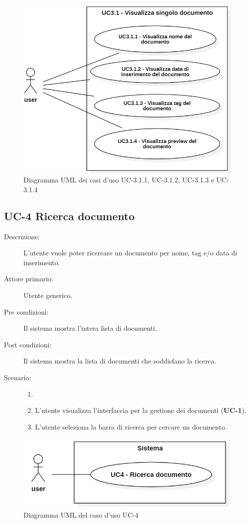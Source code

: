 \begin{figure}[H]
    \centering
    \includegraphics[width=0.8\linewidth]{UC3.1.1-2-3-4.PNG}
    \caption{Diagramma UML dei casi d'uso UC-3.1.1, UC-3.1.2, UC-3.1.3 e UC-3.1.4}
    \label{fig:UC3.1.1-2-3-4}
\end{figure}

\subsection{UC-4 Ricerca documento}
\begin{description}
    \item[Descrizione:] L’utente vuole poter ricercare un documento per nome, tag e/o data di inserimento.
    \item[Attore primario:] Utente generico.
    \item[Pre condizioni:] Il sistema mostra l’intera lista di documenti.
    \item[Post condizioni:] Il sistema mostra la lista di documenti che soddisfano la ricerca.
    \item[Scenario:]
    \begin{enumerate}
        \item[] 
        \item L’utente visualizza l'interfaccia per la gestione dei documenti (\textbf{UC-1}).
        \item L’utente seleziona la barra di ricerca per cercare un documento.
    \end{enumerate}
\end{description}

\begin{figure}[H]
    \centering
    \includegraphics[width=0.8\linewidth]{UC4.PNG}
    \caption{Diagramma UML del caso d'uso UC-4}
    \label{fig:UC4}
\end{figure}


